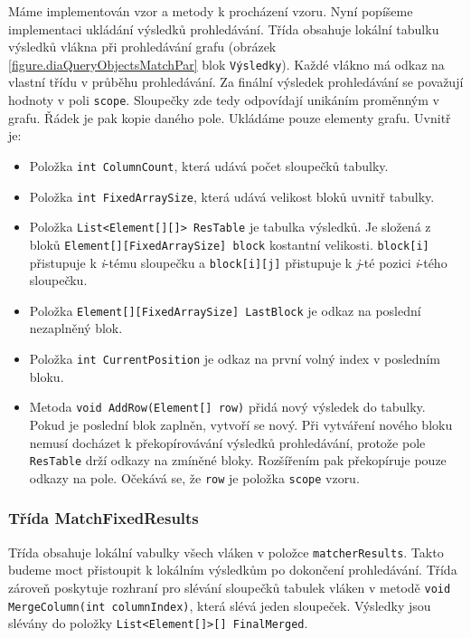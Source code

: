Máme implementován vzor a metody k procházení vzoru.
Nyní popíšeme implementaci ukládání výsledků prohledávání.
Třída obsahuje lokální tabulku výsledků vlákna při prohledávání grafu (obrázek \ref{figure.diaQueryObjectsMatchPar} blok \texttt{Výsledky}). 
Každé vlákno má odkaz na vlastní třídu v průběhu prohledávání.
Za finální výsledek prohledávání se považují hodnoty v poli \texttt{scope}.
Sloupečky zde tedy odpovídají unikáním proměnným v grafu.
Řádek je pak kopie daného pole.
Ukládáme pouze elementy grafu.
Uvnitř je:
\begin{itemize}
\item Položka \texttt{int ColumnCount}, která udává počet sloupečků tabulky. 
\item Položka \texttt{int FixedArraySize}, která udává velikost bloků uvnitř tabulky.
\item Položka \texttt{List<Element[][]> ResTable} je tabulka výsledků. 
Je složená z bloků \texttt{Element[][FixedArraySize] block} kostantní velikosti.
\texttt{block[i]} přistupuje k \textit{i}-tému sloupečku a \texttt{block[i][j]} přistupuje k \textit{j}-té pozici \textit{i}-tého sloupečku.
\item Položka \texttt{Element[][FixedArraySize] LastBlock} je odkaz na poslední nezaplněný blok.
\item Položka \texttt{int CurrentPosition} je odkaz na první volný index v posledním bloku.
\item Metoda \texttt{void AddRow(Element[] row)} přidá nový výsledek do tabulky.
Pokud je poslední blok zaplněn, vytvoří se nový.
Při vytváření nového bloku nemusí docházet k překopírovávání výsledků prohledávání, protože pole \texttt{ResTable} drží odkazy na zmíněné bloky.
Rozšířením pak překopíruje pouze odkazy na pole.
Očekává se, že \texttt{row} je položka \texttt{scope} vzoru. 

\end{itemize}

\subsubsection{Třída MatchFixedResults}

Třída obsahuje lokální vabulky všech vláken v položce \texttt{matcherResults}.
Takto budeme moct přistoupit k lokálním výsledkům po dokončení prohledávání.
Třída zároveň poskytuje rozhraní pro slévání sloupečků tabulek vláken v metodě \texttt{void MergeColumn(int columnIndex)}, která slévá jeden sloupeček.
Výsledky jsou slévány do položky \texttt{List<Element[]>[] FinalMerged}.

